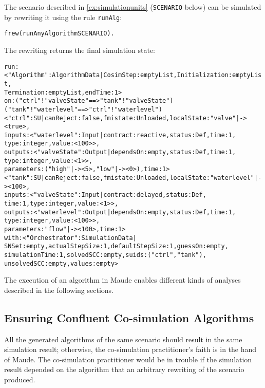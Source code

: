 \begin{example}\label{ex:algoexecution}
The scenario described in \cref{ex:simulationunits} (\texttt{SCENARIO} below) can be simulated by rewriting it using the rule \texttt{runAlg}:
\small
\begin{alltt}
  frew (runAnyAlgorithm SCENARIO).
\end{alltt}
\normalsize
The rewriting returns the final simulation state:
\scriptsize
\begin{alltt}
run: < "Algorithm" : AlgorithmData | CosimStep : emptyList,Initialization : emptyList,
                                     Termination : emptyList,endTime : 1 > 
on: ("ctrl" ! "valveState" ==> "tank" ! "valveState") 
    ("tank" ! "waterlevel" ==> "ctrl" ! "waterlevel")
< "ctrl" : SU | canReject : false, fmistate : Unloaded, localState : "valve" |-> < true >,
inputs : < "waterlevel" : Input | contract : reactive, status : Def,time : 1,
                                  type : integer, value : < 100 > >,
outputs : < "valveState" : Output | dependsOn : empty, status : Def, time : 1,
                                    type : integer, value : < 1 > >,
parameters :("high" |-> < 5 >, "low" |-> < 0 >), time : 1 > 
< "tank" : SU | canReject : false, fmistate : Unloaded, localState : "waterlevel" |-> < 100 >,
inputs : < "valveState" : Input | contract : delayed,status : Def,
                                  time : 1, type : integer, value : < 1 > >,
outputs : < "waterlevel" : Output | dependsOn : empty, status : Def,time : 1,
                                    type : integer,value : < 100 > >,
parameters : "flow" |-> < 100 >,time : 1 > 
with: < "Orchestrator" : SimulationData | 
          SNSet : empty, actualStepSize : 1, defaultStepSize : 1, guessOn : empty,
          simulationTime : 1, solvedSCC : empty, suids :("ctrl", "tank"), 
          unsolvedSCC : empty, values : empty >
\end{alltt}
\normalsize
\end{example}

The execution of an algorithm in Maude enables different kinds of analyses described in the following sections.

\subsection{Ensuring Confluent Co-simulation Algorithms}
All the generated algorithms of the same scenario should result in the same simulation result; otherwise, the co-simulation practitioner's faith is in the hand of Maude.
The co-simulation practitioner would be in trouble if the simulation result depended on the algorithm that an arbitrary rewriting of the scenario produced.

